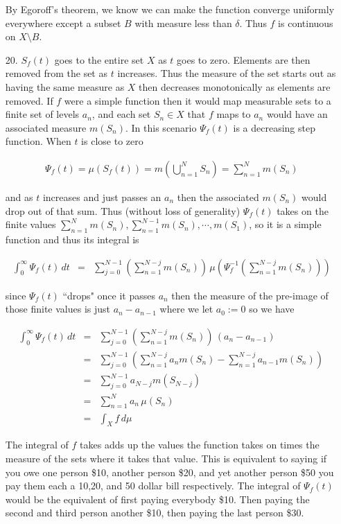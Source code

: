 \documentclass[oneside]{book}
\begin{document}
\begin{enumerate}
By Egoroff's theorem, we know we can make the function converge uniformly everywhere except a subset $B$ with measure less than $\delta$. Thus $f$ is continuous on $X \setminus B$.

\item[20.] $S_f(t)$ goes to the entire set $X$ as $t$ goes to zero. Elements are then removed from the set as $t$ increases. Thus the measure of the set starts out as having the same measure as $X$ then decreases monotonically as elements are removed. If $f$ were a simple function then it would map measurable sets to a finite set of levels $a_n$, and each set $S_n \in X$ that $f$ maps to $a_n$ would have an associated measure $m(S_n)$. In this scenario $\Psi_f(t)$ is a decreasing step function. When $t$ is close to zero

\begin{eqnarray}
\Psi_f(t)=\mu(S_f(t))=m(\bigcup_{n=1}^N S_n)=\sum_{n=1}^N m(S_n)
\end{eqnarray}

and as $t$ increases and just passes an $a_n$ then the associated $m(S_n)$ would drop out of that sum. Thus (without loss of generality) $\Psi_f(t)$ takes on the finite values $\sum_{n=1}^N m(S_n), \sum_{n=1}^{N-1} m(S_n), \cdots, m(S_1)$, so it is a simple function and thus its integral is

\begin{eqnarray}
\int_0^\infty \Psi_f(t)\,dt &=& \sum_{j=0}^{N-1} \left( \sum_{n=1}^{N-j} m(S_n) \right)\, \mu \left(\Psi_f^{-1} \left( \sum_{n=1}^{N-j} m(S_n) \right) \right)
\end{eqnarray}

since $\Psi_f(t)$ ``drops" once it passes $a_n$ then the measure of the pre-image of those finite values is just $a_n-a_{n-1}$ where we let $a_0 := 0$ so we have

\begin{eqnarray}
\int_0^\infty \Psi_f(t)\,dt &=& \sum_{j=0}^{N-1} \left( \sum_{n=1}^{N-j} m(S_n) \right)\, (a_n-a_{n-1})\nonumber\\
&=& \sum_{j=0}^{N-1} \left( \sum_{n=1}^{N-j}  a_n m(S_n)- \sum_{n=1}^{N-j}  a_{n-1} m(S_n) \right)\,\nonumber\\
&=& \sum_{j=0}^{N-1}a_{N-j} m(S_{N-j})\,\nonumber\\
&=& \sum_{n=1}^{N} a_n\,\mu(S_n)\nonumber\\
&=& \int_X f\, d\mu
\end{eqnarray}

The integral of $f$ takes adds up the values the function takes on times the measure of the sets where it takes that value. This is equivalent to saying if you owe one person \$10, another person \$20, and yet another person \$50 you pay them each a 10,20, and 50 dollar bill respectively. The integral of $\Psi_f(t)$ would be the equivalent of first paying everybody \$10. Then paying the second and third person another \$10, then paying the last person \$30.


\end{enumerate}
\end{document}
